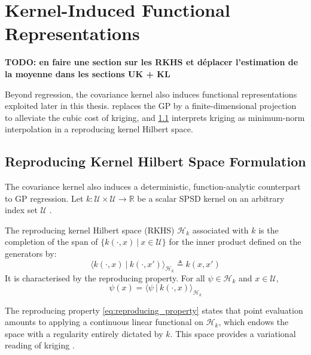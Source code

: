 \section{Kernel-Induced Functional Representations}\label{sec:functional_representations}

\textbf{TODO: en faire une section sur les RKHS et déplacer l'estimation de la moyenne dans les sections UK + KL}

Beyond regression, the covariance kernel also induces functional representations exploited later in this thesis.  replaces the GP by a finite-dimensional projection to alleviate the cubic cost of kriging, and \cref{sec:RKHS} interprets kriging as minimum-norm interpolation in a reproducing kernel Hilbert space.

\subsection{Reproducing Kernel Hilbert Space Formulation}\label{sec:RKHS}

The covariance kernel also induces a deterministic, function-analytic counterpart to GP regression. Let $k:\mathcal{U}\times\mathcal{U}\to\mathbb{R}$ be a scalar SPSD kernel on an arbitrary index set $\mathcal{U}$ \cite{bib:Aronszajn,bib:RKHS-twelve-pages}.

\begin{definition}
	The reproducing kernel Hilbert space (RKHS) $\mathcal{H}_k$ associated with $k$ is the completion of the span of $\{k(\cdot,x)\:|\:x\in\mathcal{U}\}$ for the inner product defined on the generators by:
	\begin{equation}
		\langle k(\cdot,x)\:|\:k(\cdot,x')\rangle_{\mathcal{H}_k}\triangleq k(x,x')
	\end{equation}
	It is characterised by the reproducing property. For all $\psi\in\mathcal{H}_k$ and $x\in\mathcal{U}$,
	\begin{equation}
		\psi(x)=\langle\psi\:|\:k(\cdot,x)\rangle_{\mathcal{H}_k}\label{eq:reproducing_property}
	\end{equation}
\end{definition}

The reproducing property \eqref{eq:reproducing_property} states that point evaluation amounts to applying a continuous linear functional on $\mathcal{H}_k$, which endows the space with a regularity entirely dictated by $k$. This space provides a variational reading of kriging \cite{bib:GP-kernel-methods}.

